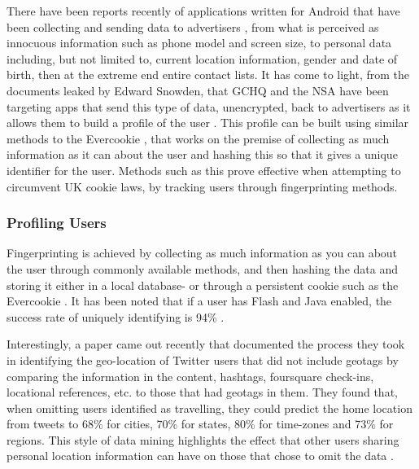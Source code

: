 There have been reports recently of applications written for Android that have been collecting and sending data to advertisers  \cite{intro:bbc_flashlight_app}, from what is perceived as innocuous information such as phone model and screen size, to personal data including, but not limited to, current location information, gender and date of birth, then at the extreme end entire contact lists. It has come to light, from the documents leaked by Edward Snowden, that GCHQ and the NSA have been targeting apps that send this type of data, unencrypted, back to advertisers as it allows them to build a profile of the user \cite{intro:angry_leak}. This profile can be built using similar methods to the Evercookie \cite{intro:evercookie}, that works on the premise of collecting as much information as it can about the user and hashing this so that it gives a unique identifier for the user. Methods such as this prove effective when attempting to circumvent UK cookie laws, by tracking users through fingerprinting methods.

\subsubsection{Profiling Users}

Fingerprinting is achieved by collecting as much information as you can about the user through commonly available methods, and then hashing the data and storing it either in a local database- or through a persistent cookie such as the Evercookie \cite{intro:evercookie}. It has been noted that if a user has Flash and Java enabled, the success rate of uniquely identifying is 94\% \cite{intro:unique_browser}. 

Interestingly, a paper \cite{intro:twitter_home_location} came out recently that documented the process they took in identifying the geo-location of Twitter users that did not include geotags by comparing the information in the content, hashtags, foursquare \cite{intro:foursquare_site} check-ins, locational references, etc. to those that had geotags \cite{intro:twitter_location_howto} in them. They found that, when omitting users identified as travelling, they could predict the home location from tweets to 68\% for cities, 70\% for states, 80\% for time-zones and 73\% for regions. This style of data mining highlights the effect that other users sharing personal location information can have on those that chose to omit the data \cite{intro:not_personal}. 

